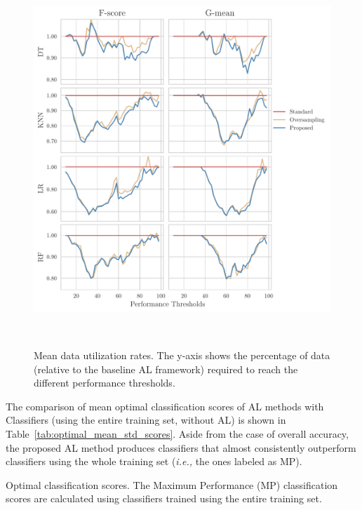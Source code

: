 \documentclass[10pt,journal,compsoc]{IEEEtran}
\begin{document}
\begin{figure}
	\centering
	\includegraphics[width=1\linewidth]{../analysis/data_utilization_rate}
    \caption{%
        Mean data utilization rates. The y-axis shows the percentage of data
        (relative to the baseline AL framework) required to reach the
        different performance thresholds.
    }~\label{fig:dur}
\end{figure}

The comparison of mean optimal classification scores of AL methods with
Classifiers (using the entire training set, without AL) is shown in
Table~\ref{tab:optimal_mean_std_scores}. Aside from the case of overall
accuracy, the proposed AL method produces classifiers that almost consistently
outperform classifiers using the whole training set (\textit{i.e.,} the ones
labeled as MP).

\begin{table}[t]
    \centering
    \caption{\label{tab:optimal_mean_std_scores}
        Optimal classification scores. The Maximum Performance (MP)
        classification scores are calculated using classifiers trained using
        the entire training set.
    }
\end{table}
\end{document}
